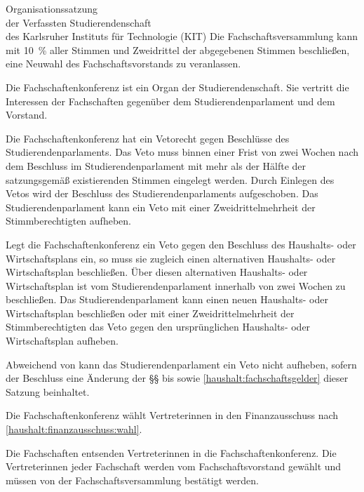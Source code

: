 \begin{jurdoc}[Organisationssatzung]{Organisationssatzung\\der Verfassten Studierendenschaft\\des Karlsruher Instituts für Technologie (KIT)}
Die Fachschaftsversammlung kann mit 10~\% aller Stimmen und Zweidrittel der abgegebenen Stimmen be\-schlie\-ßen, eine Neuwahl des Fach\-schaftsvor\-stands zu veranlassen\label{fachschaft:vv:wahl}.

%
%


 \label{fsk:aufgaben}

Die Fachschaftenkonferenz ist ein Organ der Studierendenschaft. Sie vertritt die Interessen der Fachschaften  gegenüber dem Studierendenparlament und dem Vorstand.

Die Fachschaftenkonferenz hat ein Vetorecht gegen Beschlüsse des Studierendenparlaments. Das Veto muss binnen einer Frist von zwei Wochen nach dem Beschluss im Studierendenparlament mit mehr als der Hälfte der satzungsgemäß existierenden Stimmen eingelegt werden. Durch Einlegen des Vetos wird der Beschluss des Studierendenparlaments aufgeschoben. Das Studierendenparlament kann ein Veto mit einer Zweidrittelmehrheit der Stimmberechtigten aufheben.\label{fsk:aufgaben:einspruch}

Legt die Fachschaftenkonferenz ein Veto gegen den Beschluss des Haushalts- oder Wirtschaftsplans ein, so muss sie zugleich einen alternativen Haushalts- oder Wirtschaftsplan beschließen. Über diesen alternativen Haushalts- oder Wirtschaftsplan ist vom Studierendenparlament innerhalb von zwei Wochen zu beschließen. Das Studierendenparlament kann einen neuen Haushalts- oder Wirtschaftsplan beschließen oder mit einer Zweidrittelmehrheit der Stimmberechtigten das Veto gegen den ursprünglichen Haushalts- oder Wirtschaftsplan aufheben. \label{fsk:aufgaben:haushalt}

Abweichend von  kann das Studierendenparlament ein Veto nicht aufheben, sofern der Beschluss eine Änderung der §§  bis  sowie \ref{haushalt:fachschaftsgelder} dieser Satzung beinhaltet.

Die Fachschaftenkonferenz wählt Vertreterinnen in den Finanzausschuss nach \ref{haushalt:finanzausschuss:wahl}.


Die Fachschaften entsenden Vertreterinnen in die Fachschaftenkonferenz. Die Vertreterinnen jeder Fachschaft werden vom Fachschaftsvorstand gewählt und müssen von der Fachschaftsversammlung bestätigt werden.\label{fsk:zusammensetzung:vertreter}


\end{jurdoc}
